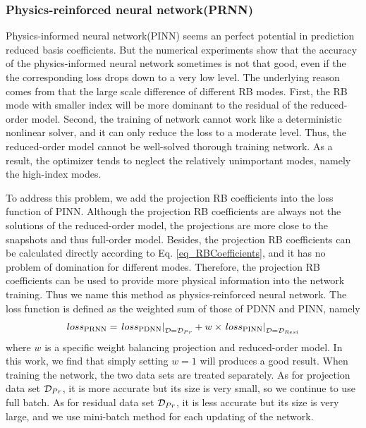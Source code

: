 \documentclass[preprint, 10pt]{elsarticle}
\begin{document}
\subsubsection{Physics-reinforced neural network(PRNN)}
\label{PRNN}
Physics-informed neural network(PINN) seems an perfect potential in prediction reduced basis coefficients. But the numerical experiments show that  the accuracy of the physics-informed neural network sometimes is not that good, even if the the corresponding loss drops down to a very low level. The underlying reason comes from that the large scale difference of different RB modes.
First, the RB mode with smaller index will be more dominant to the residual of the reduced-order model. Second, the training of network cannot work like a deterministic nonlinear solver, and it can only reduce the loss to a moderate level. Thus, the reduced-order model cannot be well-solved thorough training network. As a result, the optimizer tends to neglect the relatively unimportant modes, namely the high-index modes.

To address this problem, we add the projection RB coefficients into the loss function of PINN. Although the projection RB coefficients are always not the solutions of the reduced-order model, the projections are more close to the snapshots and thus full-order model. Besides, the projection RB coefficients can be calculated directly according to Eq. \ref{eq_RBCoefficients}, and it has no problem of domination for different modes. Therefore, the projection RB coefficients can be used to provide more physical information into the network training. Thus we name this method as physics-reinforced neural network. The loss function is defined as the weighted sum of those of PDNN and PINN, namely
\begin{equation}
{loss}_{\rm{PRNN}} =
\left. {{loss}_{\rm{PDNN}}} \right|_{{\cal{D}} = {\cal {D}}_{Pr} }
+
w \times \left. {{loss}_{\rm{PINN}}} \right|_{{\cal D} = {\cal D}_{Resi }}
\label{eq_lossPRNN}
\end{equation}
where $w$ is a specific weight balancing projection and reduced-order model. In this work, we find that simply setting $w=1$ will produces a good result.  When training the network, the two data sets are treated separately. As for projection data set ${\cal D}_{Pr}$, it is more accurate but its size is very small, so we continue to use full batch. As for residual data set ${\cal D}_{Pr}$, it is less accurate but its size is very large, and we use mini-batch method for each updating of the network.
\end{document}
